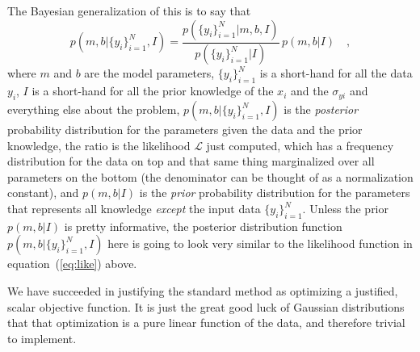 \documentclass[12pt]{article}
\newcommand{\equationname}{equation}
\newcounter{problem}
\newcommand{\setofall}[3]{\{{#1}\}_{{#2}}^{{#3}}}
\newcommand{\ally}{\setofall{y_i}{i=1}{N}}
\newcommand{\like}{\mathscr{L}}
\begin{document}
The Bayesian generalization of this is to say that
\begin{equation}
p(m,b|\ally,I) = \frac{p(\ally|m,b,I)}{p(\ally|I)}\,p(m,b|I) \quad ,
\end{equation}
where $m$ and $b$ are the model parameters, $\ally$ is a short-hand
for all the data $y_i$, $I$ is a short-hand for all the prior
knowledge of the $x_i$ and the $\sigma_{yi}$ and everything else about
the problem, $p(m,b|\ally,I)$ is the \emph{posterior} probability
distribution for the parameters given the data and the prior
knowledge, the ratio is the likelihood $\like$ just computed, which
has a frequency distribution for the data on top and that same thing
marginalized over all parameters on the bottom (the denominator can be
thought of as a normalization constant), and $p(m,b|I)$ is the
\emph{prior} probability distribution for the parameters that
represents all knowledge \emph{except} the input data $\ally$.  Unless
the prior $p(m,b|I)$ is pretty informative, the posterior distribution
function $p(m,b|\ally,I)$ here is going to look very similar to the
likelihood function in \equationname~(\ref{eq:like}) above.

We have succeeded in justifying the standard method as optimizing a
justified, scalar objective function.  It is just the great good luck
of Gaussian distributions that that optimization is a pure linear
function of the data, and therefore trivial to implement.
\end{document}
